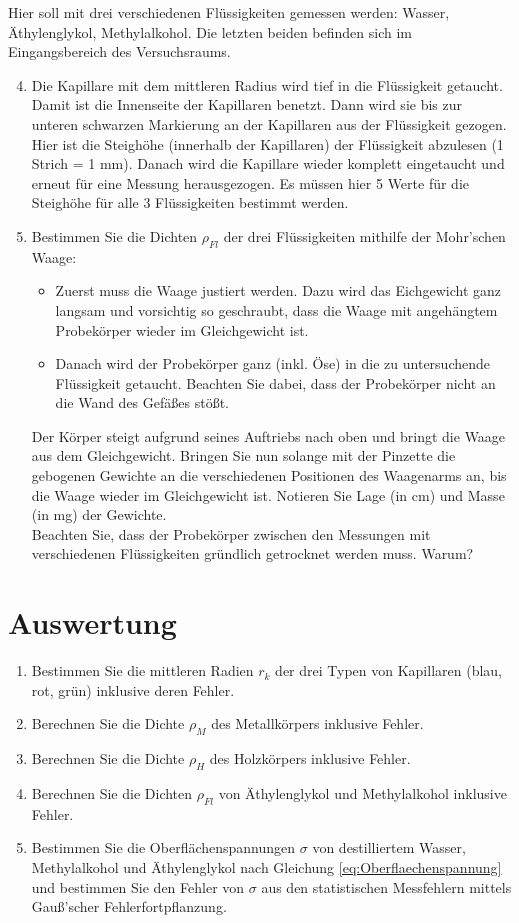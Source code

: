 Hier soll mit drei verschiedenen Flüssigkeiten gemessen werden: Wasser, Äthylenglykol, Methylalkohol. Die letzten beiden befinden sich im Eingangsbereich des Versuchsraums.
%
\begin{enumerate} \setcounter{enumi}{3}
 \item Die Kapillare mit dem mittleren Radius wird tief in die Flüssigkeit getaucht. Damit ist die Innenseite der Kapillaren benetzt. Dann wird sie bis zur unteren schwarzen Markierung an der Kapillaren aus der Flüssigkeit gezogen. Hier ist die Steighöhe (innerhalb der Kapillaren) der Flüssigkeit abzulesen (1 Strich = 1 mm). Danach wird die Kapillare wieder komplett eingetaucht und erneut für eine Messung herausgezogen. Es müssen hier 5 Werte für die Steighöhe für alle 3 Flüssigkeiten bestimmt werden.
 \item Bestimmen Sie die Dichten $\rho_{Fl}$ der drei Flüssigkeiten mithilfe der Mohr'schen Waage:
  \begin{itemize}
   \item Zuerst muss die Waage justiert werden. Dazu wird das Eichgewicht ganz langsam und vorsichtig so geschraubt, dass die Waage mit angehängtem Probekörper wieder im Gleichgewicht ist. 
   \item Danach wird der Probekörper ganz (inkl. Öse) in die zu untersuchende Flüssigkeit getaucht. Beachten Sie dabei, dass der Probekörper nicht an die Wand des Gefäßes stößt.
  \end{itemize}
  Der Körper steigt aufgrund seines Auftriebs nach oben und bringt die Waage aus dem Gleichgewicht. Bringen Sie nun solange mit der Pinzette die gebogenen Gewichte an die verschiedenen Positionen des Waagenarms an, bis die Waage wieder im Gleichgewicht ist. Notieren Sie Lage (in cm) und Masse (in mg) der Gewichte.\\
  
  Beachten Sie, dass der Probekörper zwischen den Messungen mit verschiedenen Flüssigkeiten gründlich getrocknet werden muss. Warum?
\end{enumerate}
\section{Auswertung} 

\begin{enumerate}
 \item Bestimmen Sie die mittleren Radien $r_k$ der drei Typen von Kapillaren (blau, rot, grün) inklusive deren Fehler.
 \item Berechnen Sie die Dichte $\rho_M$ des Metallkörpers inklusive Fehler.
 \item Berechnen Sie die Dichte $\rho_H$ des Holzkörpers inklusive Fehler.
 \item Berechnen Sie die Dichten $\rho_{Fl}$ von Äthylenglykol und Methylalkohol inklusive Fehler.
 \item Bestimmen Sie die Oberflächenspannungen $\sigma$ von destilliertem Wasser, Methylalkohol und Äthylenglykol nach Gleichung \ref{eq:Oberflaechenspannung} und bestimmen Sie den Fehler von $\sigma$ aus den statistischen Messfehlern mittels Gauß'scher Fehlerfortpflanzung.
\end{enumerate}